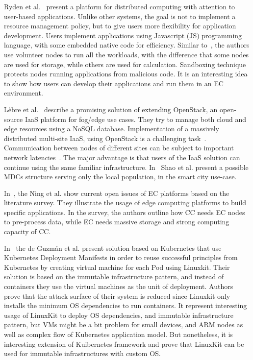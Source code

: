 Ryden et al.~\cite{RydenOCW14} present a platform for distributed computing with attention to user-based applications. Unlike other systems, the goal is not to implement a resource management policy, but to give users more flexibility for application development. Users implement applications using Javascript (JS) programming language, with some embedded native code for efficiency. Similar to~\cite{CiobanuNPDMM19}, the authors use volunteer nodes to run all the workloads, with the difference that some nodes are used for storage, while others are used for calculation. Sandboxing technique protects nodes running applications from malicious code. It is an interesting idea to show how users can develop their applications and run them in an EC environment.

L{\`{e}}bre et al.~\cite{LebrePSD17} describe a promising solution of extending OpenStack, an open-source IaaS platform for fog/edge use cases. They try to manage both cloud and edge resources using a NoSQL database. Implementation of a massively distributed multi-site IaaS, using OpenStack is a challenging task~\cite{LebrePSD17}. Communication between nodes of different sites can be subject to important network latencies~\cite{LebrePSD17}. The major advantage is that users of the IaaS solution can continue using the same familiar infrastructure. In~\cite{ShaoLFJL19} Shao et al. present a possible MDCs structure serving only the local population, in the smart city use-case.

In~\cite{NingLSY20}, the Ning et al. show current open issues of EC platforms based on the literature survey. They illustrate the usage of edge computing platforms to build specific applications. In the survey, the authors outline how CC needs EC nodes to pre-process data, while EC needs massive storage and strong computing capacity of CC.

In~\cite{abs-1802-10375} the de Guzm{\'{a}}n et al. present solution based on Kubernetes that use Kubernetes Deployment Manifests in order to reuse successful principles from Kubernetes by creating  virtual machine for each Pod using Linuxkit. Their solution is based on the immutable infrastructure pattern, and instead of containers they use the virtual machines as the unit of deployment. Authors prove that the attack surface of their system is reduced since Linuxkit only installs the minimum OS dependencies to run containers. It represent interesting usage of LinuxKit to deploy OS dependencies, and immutable infrastructure pattern, but VMs might be a bit problem for small devices, and ARM nodes as well as complex flow of Kubernetes application model. But nonetheless, it is interesting extension of Kuibernetes framework and prove that LinuxKit can be used for immutable infrastructures with custom OS.

